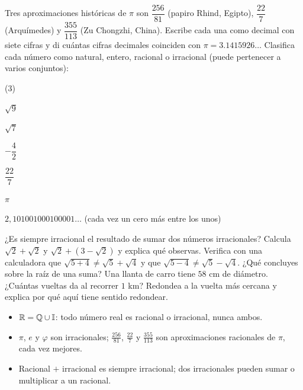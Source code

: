 \documentclass[11pt]{article}
\newcommand{\I}{\mathbb{I}}
\begin{document}
\begin{preguntas}
\pregunta Tres aproximaciones históricas de $\pi$ son $\dfrac{256}{81}$
(papiro Rhind, Egipto), $\dfrac{22}{7}$ (Arquímedes) y $\dfrac{355}{113}$
(Zu Chongzhi, China). Escribe cada una como decimal con siete cifras y di
cuántas cifras decimales coinciden con $\pi = \num{3,1415926}\ldots$
\espacio{3cm}
\pregunta Clasifica cada número como natural, entero, racional o irracional
(puede pertenecer a varios conjuntos):
\begin{opciones*}(3)
  \item $\sqrt{9}$
  \item $\sqrt{7}$
  \item $-\dfrac{4}{2}$
  \item $\dfrac{22}{7}$
  \item $\pi$
  \item $2{,}101001000100001\ldots$ (cada vez un cero más entre los unos)
\end{opciones*}
\espacio{3cm}
\pregunta ¿Es siempre irracional el resultado de sumar dos números
irracionales? Calcula $\sqrt{2} + \sqrt{2}$ y $\sqrt{2} + (3 - \sqrt{2})$ y
explica qué observas.
\espacio{3cm}
\pregunta Verifica con una calculadora que $\sqrt{5 + 4} \neq \sqrt{5} +
\sqrt{4}$ y que $\sqrt{5 - 4} \neq \sqrt{5} - \sqrt{4}$. ¿Qué concluyes sobre
la raíz de una suma?
\espacio{3cm}
\pregunta Una llanta de carro tiene $58$ cm de diámetro. ¿Cuántas vueltas da
al recorrer $1$ km? Redondea a la vuelta más cercana y explica por qué aquí
tiene sentido redondear.
\espacio{2.5cm}
\end{preguntas}

\begin{resumen}
\begin{itemize}
  \item $\R = \Q \cup \I$: todo número real es racional o irracional, nunca
        ambos.
  \item $\pi$, $e$ y $\varphi$ son irracionales; $\frac{256}{81}$,
        $\frac{22}{7}$ y $\frac{355}{113}$ son aproximaciones racionales de
        $\pi$, cada vez mejores.
  \item Racional $+$ irracional es siempre irracional; dos irracionales
        pueden sumar o multiplicar a un racional.
\end{itemize}
\end{resumen}
\end{document}
